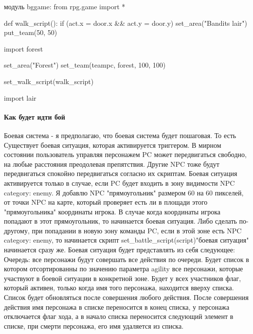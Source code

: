 модуль bggame:
from rpg.game import *

def walk\_script():
	if (act.x = door.x \&\& act.y = door.y)
		set\_area("Bandits lair")
		put\_team(50, 50)

import forest

set\_area("Forest")
set\_team(teampc, forest, 100, 100)


set\_walk\_script(walk\_script)

import lair


\paragraph{Как будет идти бой}
Боевая система - я предполагаю, что боевая система будет пошаговая. То есть Существует боевая ситуация, которая активируется триггером. В мирном состоянии пользователь управляя персонажем PC может передвигаться свободно, на любые расстояния преодолевая препятствия. Другие NPC тоже будут передвигаться спокойно передвигаться согласно их скриптам. Боевая ситуация активируется только в случае, если PC будет входить в зону видимости NPC category: enemy. Я добавлю NPC "прямоугольник" размером 60 на 60 пикселей, от точки NPC на карте, который проверяет есть ли в площади этого "прямоугольника" координаты игрока. В случае когда координаты игрока попадают в этот прямоугольник, то начинается боевая ситуация. Либо сделать по-другому, при попадании в новую зону команды PC, если в этой зоне есть NPC category: enemy, то начинается скрипт set\_battle\_script(script)"боевая ситуация" начинается сразу же. Боевая ситуация будет представлять из себя следующее:
Очередь: все персонажи будут совершать все действия по очереди. Будет список в котором отсортированны по значению параметра agility все персонажи, которые участвуют в боевой ситуации в конкретной зоне. Будет у всех участников флаг, который активен, только когда имя того персонажа, находится вверху списка. Список будет обновляться после совершения любого действия. После совершения действия имя персонажа в списке переносится в конец списка, у персонажа отключается флаг хода, а в начало списка переносится следующий элемент в списке, при смерти персонажа, его имя удаляется из списка.
